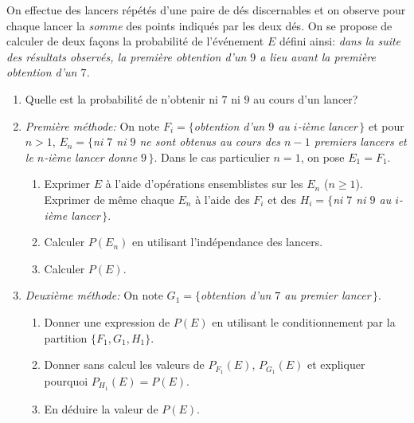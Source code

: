 \documentclass[a4paper,12pt,reqno]{amsart}
\begin{document}
\begin{exo}

  On effectue des lancers répétés d'une paire de dés discernables et on observe pour
  chaque lancer la \emph{somme} des points indiqués par les deux dés. On se
  propose de calculer de deux façons la probabilité de l'événement $E$ défini
  ainsi: \emph{dans la suite des résultats observés, la première obtention d'un
  $9$ a lieu avant la première obtention d'un $7$.}

  \begin{enumerate}
    \item  Quelle est la probabilité de n'obtenir ni $7$ ni $9$ au cours d'un lancer?
    \item \emph{Première méthode:} On note $F_i=\{$\emph{obtention d'un $9$ au $i$-ième lancer\,}$\}$ et pour $n>1$, $E_n=\{$\emph{ni $7$ ni $9$ ne sont obtenus au cours des $n-1$ premiers lancers et le $n$-ième lancer donne $9$\,}$\}$. Dans le cas particulier $n=1$, on pose $E_1=F_1$.
      \begin{enumerate}
        \item Exprimer $E$ à l'aide d'opérations ensemblistes sur les $E_n$ ($n\geq 1$). Exprimer de même chaque $E_n$ à l'aide  des $F_i$ et des  $H_i=\{$\emph{ni $7$ ni $9$ au $i$-ième lancer\,}$\}$.
        \item Calculer $P(E_n)$ en utilisant l'indépendance des lancers.
        \item Calculer $P(E)$.
      \end{enumerate}
    \item \emph{Deuxième méthode:}  On note $G_1=\{$\emph{obtention d'un $7$ au premier lancer\,}$\}$.
      \begin{enumerate}
        \item Donner une expression de $P(E)$ en utilisant le conditionnement par la partition $\{F_1,G_1,H_1\}$.
        \item Donner sans calcul les valeurs de $P_{F_1}(E)$, $P_{G_1}(E)$ et expliquer pourquoi $P_{H_1}(E)=P(E)$.
        \item En déduire la valeur de $P(E)$.
      \end{enumerate}
  \end{enumerate}

\end{exo}
\end{document}
